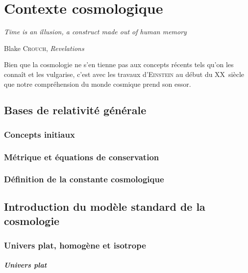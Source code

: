 \documentclass[../main/main.tex]{subfiles}
\begin{document}
\mainmatter

\chapter{Contexte cosmologique}\label{ch:cosmo}

\epigraph{\textit{Time is an illusion, a construct made out of human
memory}}{Blake \textsc{Crouch}, \textit{Revelations}}

\noindent Bien que la cosmologie ne s'en tienne pas aux concepts récents tels
qu'on les connaît et les vulgarise, c'est avec les travaux d'\textsc{Einstein}
au début du XX\ieme~siècle que notre compréhension du monde cosmique prend son
essor. 

\minitoc
\newpage

\section{Bases de relativité générale}\label{sec:11}

\subsection{Concepts initiaux}\label{ssec:RG}

\subsection{Métrique et équations de conservation}\label{ssec:112}

\subsection{Définition de la constante cosmologique}\label{ssec:lambda}

\section{Introduction du modèle standard de la cosmologie}\label{sec:MS}

\subsection{Univers plat, homogène et isotrope}\label{ssec:plat}

\paragraph*{Univers plat}
\end{document}
